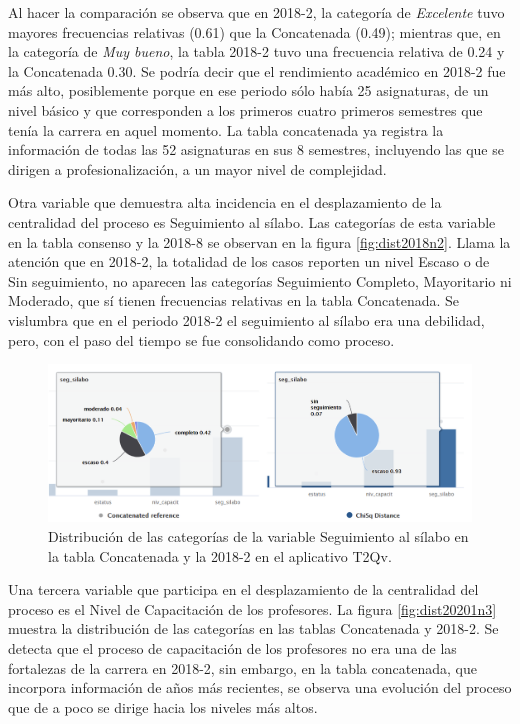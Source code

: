 \documentclass[mathematics,article,submit,moreauthors,pdftex]{mdpi}
\begin{document}
Al hacer la comparación se observa que en 2018-2, la categoría de
\emph{Excelente} tuvo mayores frecuencias relativas (0.61) que la
Concatenada (0.49); mientras que, en la categoría de \emph{Muy bueno},
la tabla 2018-2 tuvo una frecuencia relativa de 0.24 y la Concatenada
0.30. Se podría decir que el rendimiento académico en 2018-2 fue más
alto, posiblemente porque en ese periodo sólo había 25 asignaturas, de
un nivel básico y que corresponden a los primeros cuatro primeros
semestres que tenía la carrera en aquel momento. La tabla concatenada ya
registra la información de todas las 52 asignaturas en sus 8 semestres,
incluyendo las que se dirigen a profesionalización, a un mayor nivel de
complejidad.

Otra variable que demuestra alta incidencia en el desplazamiento de la
centralidad del proceso es Seguimiento al sílabo. Las categorías de esta
variable en la tabla consenso y la 2018-8 se observan en la figura
\ref{fig:dist2018n2}. Llama la atención que en 2018-2, la totalidad de
los casos reporten un nivel Escaso o de Sin seguimiento, no aparecen las
categorías Seguimiento Completo, Mayoritario ni Moderado, que sí tienen
frecuencias relativas en la tabla Concatenada. Se vislumbra que en el
periodo 2018-2 el seguimiento al sílabo era una debilidad, pero, con el
paso del tiempo se fue consolidando como proceso.

\begin{figure}[H]


\begin{center}\includegraphics[width=0.9\linewidth,]{dist20182n1} \end{center}

\caption{Distribución de las categorías de la variable Seguimiento al sílabo en la tabla Concatenada y la 2018-2 en el aplicativo T2Qv.}
\label{fig:dist2018n1}
\end{figure}

Una tercera variable que participa en el desplazamiento de la
centralidad del proceso es el Nivel de Capacitación de los profesores.
La figura \ref{fig:dist20201n3} muestra la distribución de las
categorías en las tablas Concatenada y 2018-2. Se detecta que el proceso
de capacitación de los profesores no era una de las fortalezas de la
carrera en 2018-2, sin embargo, en la tabla concatenada, que incorpora
información de años más recientes, se observa una evolución del proceso
que de a poco se dirige hacia los niveles más altos.
\end{document}
